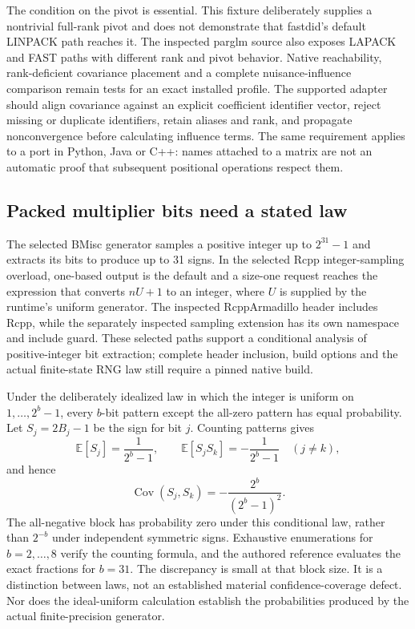 The condition on the pivot is essential. This fixture deliberately supplies a nontrivial full-rank pivot and does not demonstrate that fastdid's default LINPACK path reaches it. The inspected parglm source also exposes LAPACK and FAST paths with different rank and pivot behavior. Native reachability, rank-deficient covariance placement and a complete nuisance-influence comparison remain tests for an exact installed profile. The supported adapter should align covariance against an explicit coefficient identifier vector, reject missing or duplicate identifiers, retain aliases and rank, and propagate nonconvergence before calculating influence terms. The same requirement applies to a port in Python, Java or C++: names attached to a matrix are not an automatic proof that subsequent positional operations respect them.~\citep{exec29_panel_inference_sources,exec29_panel_runtime_sources,exec29_panel_runtime_reference}

\subsection{Packed multiplier bits need a stated law}

The selected BMisc generator samples a positive integer up to $2^{31}-1$ and extracts its bits to produce up to 31 signs. In the selected Rcpp integer-sampling overload, one-based output is the default and a size-one request reaches the expression that converts $nU+1$ to an integer, where $U$ is supplied by the runtime's uniform generator. The inspected RcppArmadillo header includes Rcpp, while the separately inspected sampling extension has its own namespace and include guard. These selected paths support a conditional analysis of positive-integer bit extraction; complete header inclusion, build options and the actual finite-state RNG law still require a pinned native build.~\citep{exec29_panel_inference_sources,exec29_panel_runtime_sources}

Under the deliberately idealized law in which the integer is uniform on $1,\ldots,2^b-1$, every $b$-bit pattern except the all-zero pattern has equal probability. Let $S_j=2B_j-1$ be the sign for bit $j$. Counting patterns gives
\[
 \mathbb E[S_j]=\frac{1}{2^b-1},\qquad
 \mathbb E[S_jS_k]=-\frac{1}{2^b-1}\quad(j\ne k),
\]
and hence
\[
 \operatorname{Cov}(S_j,S_k)=-\frac{2^b}{(2^b-1)^2}.
\]
The all-negative block has probability zero under this conditional law, rather than $2^{-b}$ under independent symmetric signs. Exhaustive enumerations for $b=2,\ldots,8$ verify the counting formula, and the authored reference evaluates the exact fractions for $b=31$. The discrepancy is small at that block size. It is a distinction between laws, not an established material confidence-coverage defect. Nor does the ideal-uniform calculation establish the probabilities produced by the actual finite-precision generator.~\citep{exec29_panel_runtime_reference}

